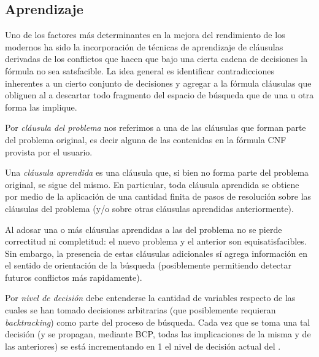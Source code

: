 \subsection{Aprendizaje}
Uno de los factores más determinantes en la mejora del rendimiento de los \ssolver modernos ha sido la incorporación de técnicas de aprendizaje de cláusulas derivadas de los conflictos que hacen que bajo una cierta cadena de decisiones la fórmula no sea satsfacible. La idea general es identificar contradicciones inherentes a un cierto conjunto de decisiones y agregar a la fórmula cláusulas que obliguen al \ssolver a descartar todo fragmento del espacio de búsqueda que de una u otra forma las implique.

\begin{definition}
Por \emph{cláusula del problema} nos referimos a una de las cláusulas que forman parte del problema original, es decir alguna de las contenidas en la fórmula CNF provista por el usuario.
\end{definition}

\begin{definition}
Una \emph{cláusula aprendida} es una cláusula que, si bien no forma parte del problema original, se sigue del mismo. En particular, toda cláusula aprendida se obtiene por medio de la aplicación de una cantidad finita de pasos de resolución sobre las cláusulas del problema (y/o sobre otras cláusulas aprendidas anteriormente).
\end{definition}

\begin{remark}
Al adosar una o más cláusulas aprendidas a las del problema no se pierde correctitud ni completitud: el nuevo problema y el anterior son equisatisfacibles. Sin embargo, la presencia de estas cláusulas adicionales sí agrega información en el sentido de orientación de la búsqueda (posiblemente permitiendo detectar futuros conflictos más rapidamente). 
\end{remark}

\begin{definition}
Por \emph{nivel de decisión} debe entenderse la cantidad de variables respecto de las cuales se han tomado decisiones arbitrarias (que posiblemente requieran \emph{backtracking}) como parte del proceso de búsqueda. Cada vez que se toma una tal decisión (y se propagan, mediante BCP, todas las implicaciones de la misma y de las anteriores) se está incrementando en 1 el nivel de decisión actual del \ssolver.
\end{definition}



